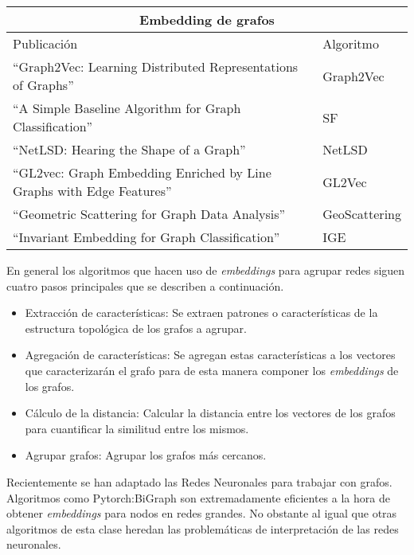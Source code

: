 \begin{table}
\centering
\caption{}
\label{table:graphEmbedding}
    \begin{tabular}{ |p{8cm}|p{2cm}|  }
    \hline
    \multicolumn{2}{|c|}{Embedding de grafos} \\
    \hline
    Publicación & Algoritmo \\
    \hline
    “Graph2Vec: Learning Distributed Representations of Graphs” \cite{narayanan_graph2vec_2017} & Graph2Vec  \\
    \hline
    “A Simple Baseline Algorithm for Graph Classification” \cite{de_lara_simple_2018} & SF \\
    \hline
    “NetLSD: Hearing the Shape of a Graph” \cite{tsitsulin_netlsd_2018} & NetLSD \\
    \hline
    “GL2vec: Graph Embedding Enriched by Line Graphs with Edge Features” & GL2Vec \\
    \hline
    “Geometric Scattering for Graph Data Analysis” \cite{gao_geometric_nodate} & GeoScattering \\
    \hline
    “Invariant Embedding for Graph Classification” \cite{galland_invariant_nodate} & IGE \\
    \hline
    \end{tabular}
\end{table}

En general los algoritmos que hacen uso de \textit{embeddings} para agrupar redes siguen cuatro pasos principales que se describen a continuación.
\begin{itemize}
    \item Extracción de características: Se extraen patrones o características de la estructura topológica de los grafos a agrupar.
    
    \item Agregación de características: Se agregan estas características a los vectores que caracterizarán el grafo para de esta manera componer los \textit{embeddings} de los grafos.
    
    \item Cálculo de la distancia: Calcular la distancia entre los vectores de los grafos para cuantificar la similitud entre los mismos.
    
    \item Agrupar grafos: Agrupar los grafos más cercanos.
\end{itemize}

Recientemente se han adaptado las Redes Neuronales para trabajar con grafos. Algoritmos como Pytorch:BiGraph \cite{lerer_pytorch-biggraph_2019} son extremadamente eficientes a la hora de obtener \textit{embeddings} para nodos en redes grandes. No obstante al igual que otras algoritmos de esta clase heredan las problemáticas de interpretación de las redes neuronales.

